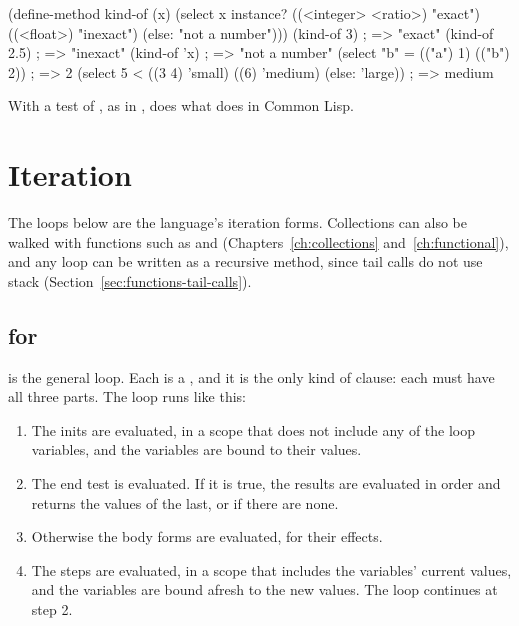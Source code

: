 \begin{dylan}
(define-method kind-of (x)
  (select x instance?
    ((<integer> <ratio>) "exact")
    ((<float>) "inexact")
    (else: "not a number")))
(kind-of 3)              ; => "exact"
(kind-of 2.5)            ; => "inexact"
(kind-of 'x)             ; => "not a number"
(select "b" = (("a") 1) (("b") 2))   ; => 2
(select 5 < ((3 4) 'small) ((6) 'medium) (else: 'large))   ; => medium
\end{dylan}

\noindent With a test of , as in ,
 does what  does in Common Lisp.

\section{Iteration}\label{sec:control-loops}

The loops below are the language's iteration forms. Collections can also
be walked with functions such as  and 
(Chapters~\ref{ch:collections} and~\ref{ch:functional}), and any loop can be
written as a recursive method, since tail calls do not use stack
(Section~\ref{sec:functions-tail-calls}).

\subsection{for}

\begin{quote}
\end{quote}

\noindent {} is the general loop. Each  is a , and it is the only
kind of clause: each must have all three parts. The loop runs like this:

\begin{enumerate}
\item The inits are evaluated, in a scope that does not include any of the
  loop variables, and the variables are bound to their values.
\item The end test is evaluated. If it is true, the results are evaluated
  in order and  returns the values of the last, or  if
  there are none.
\item Otherwise the body forms are evaluated, for their effects.
\item The steps are evaluated, in a scope that includes the variables'
  current values, and the variables are bound afresh to the new values.
  The loop continues at step 2.
\end{enumerate}

